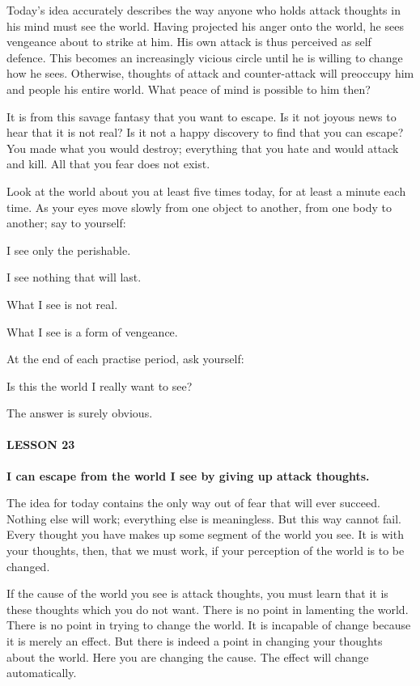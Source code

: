 Today's idea accurately describes the way anyone who holds attack thoughts in his mind must see the world. Having projected his anger onto the world, he sees vengeance about to strike at him. His own attack is thus perceived as self defence. This becomes an increasingly vicious circle until he is willing to change how he sees. Otherwise, thoughts of attack and counter-attack will preoccupy him and people his entire world. What peace of mind is possible to him then?

It is from this savage fantasy that you want to escape. Is it not joyous news to hear that it is not real? Is it not a happy discovery to find that you can escape? You made what you would destroy; everything that you hate and would attack and kill. All that you fear does not exist.

Look at the world about you at least five times today, for at least a minute each time. As your eyes move slowly from one object to another, from one body to another; say to yourself:

I see only the perishable.

I see nothing that will last.

What I see is not real.

What I see is a form of vengeance.

At the end of each practise period, ask yourself:

Is this the world I really want to see?

The answer is surely obvious.

\paragraph{LESSON 23}


\textbf{I can escape from the world I see by giving up attack thoughts.}


The idea for today contains the only way out of fear that will ever succeed. Nothing else will work; everything else is meaningless. But this way cannot fail. Every thought you have makes up some segment of the world you see. It is with your thoughts, then, that we must work, if your perception of the world is to be changed.

If the cause of the world you see is attack thoughts, you must learn that it is these thoughts which you do not want. There is no point in lamenting the world. There is no point in trying to change the world. It is incapable of change because it is merely an effect. But there is indeed a point in changing your thoughts about the world. Here you are changing the cause. The effect will change automatically.

